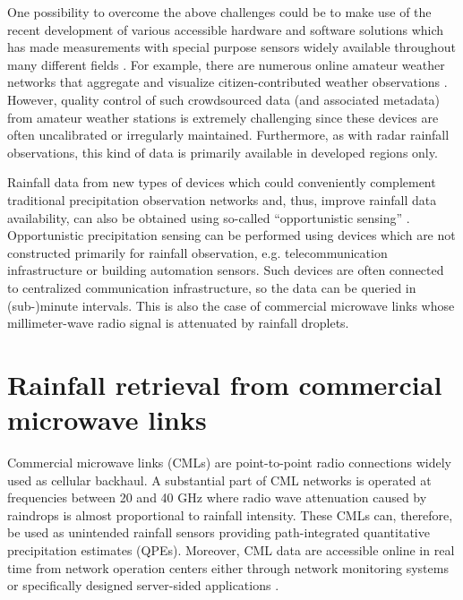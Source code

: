\documentclass{ctuthesis}\usepackage[]{graphicx}\usepackage[]{color}
\begin{document}
One possibility to overcome the above challenges could be to make use of the recent development of various accessible hardware and software solutions which has made measurements with special purpose sensors widely available throughout many different fields \citep{swanSensorManiaInternet2012}. For example, there are numerous online amateur weather networks that aggregate and visualize citizen-contributed weather observations \citep{gharesifardBenchmarkingCitizenObservatories2017, devosPotentialUrbanRainfall2017}. However, quality control of such crowdsourced data (and associated metadata) from amateur weather stations is extremely challenging since these devices are often uncalibrated or irregularly maintained. Furthermore, as with radar rainfall observations, this kind of data is primarily available in developed regions only.

Rainfall data from new types of devices which could conveniently complement traditional precipitation observation networks and, thus, improve rainfall data availability, can also be obtained using so-called \enquote{opportunistic sensing} \citep{tauroMeasurementsObservationsXXI2018}. Opportunistic precipitation sensing can be performed using devices which are not constructed primarily for rainfall observation, e.g. telecommunication infrastructure or building automation sensors. Such devices are often connected to centralized communication infrastructure, so the data can be queried in (sub-)minute intervals. This is also the case of commercial microwave links whose millimeter-wave radio signal is attenuated by rainfall droplets.


\section{Rainfall retrieval from commercial microwave links}

Commercial microwave links (CMLs) are point-to-point radio connections widely used as cellular backhaul. A substantial part of CML networks is operated at frequencies between 20 and 40 GHz where radio wave attenuation caused by raindrops is almost proportional to rainfall intensity. These CMLs can, therefore, be used as unintended rainfall sensors providing path-integrated quantitative precipitation estimates (QPEs). Moreover, CML data are accessible online in real time from network operation centers either through network monitoring systems or specifically designed server-sided applications \citep{chwalaRealtimeDataAcquisition2016}.
\end{document}
